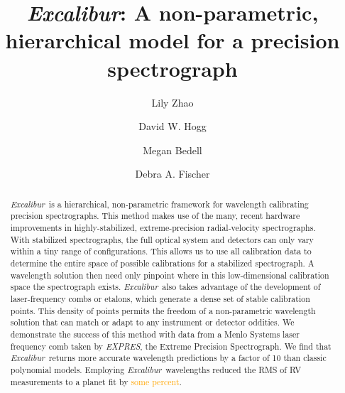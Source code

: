 \documentclass[twocolumn]{aastex63}
\newcommand{\lz}[1]{\textcolor{orange}{#1}}
\newcommand{\project}[1]{\textsl{#1}}
\newcommand{\name}{\project{Excalibur}}
\newcommand{\acronym}[1]{{\small{#1}}}
\newcommand{\expres}{\project{\acronym{EXPRES}}}
\begin{document}
\title{\name:
A non-parametric, hierarchical model for a precision spectrograph}


\author[0000-0002-3852-3590]{Lily Zhao}

\author[0000-0003-2866-9403]{David W. Hogg}

\author[0000-0001-9907-7742]{Megan Bedell}

\author[0000-0003-2221-0861]{Debra A. Fischer}

\begin{abstract}
\name\ is a hierarchical, non-parametric framework for wavelength calibrating precision spectrographs.  This method makes use of the many, recent hardware improvements in highly-stabilized, extreme-precision radial-velocity spectrographs.  With stabilized spectrographs, the full optical system and detectors can only vary within a tiny range of configurations.  This allows us to use all calibration data to determine the entire space of possible calibrations for a stabilized spectrograph.  A wavelength solution then need only pinpoint where in this low-dimensional calibration space the spectrograph exists.  \name\ also takes advantage of the development of laser-frequency combs or etalons, which generate a dense set of stable calibration points.  This density of points permits the freedom of a non-parametric wavelength solution that can match or adapt to any instrument or detector oddities.  We demonstrate the success of this method with data from a Menlo Systems laser frequency comb taken by \expres, the Extreme Precision Spectrograph.  We find that \name\ returns more accurate wavelength predictions by a factor of 10 than classic polynomial models.  Employing \name\ wavelengths reduced the RMS of RV measurements to a planet fit by \lz{some percent}.
\end{abstract}
\end{document}
